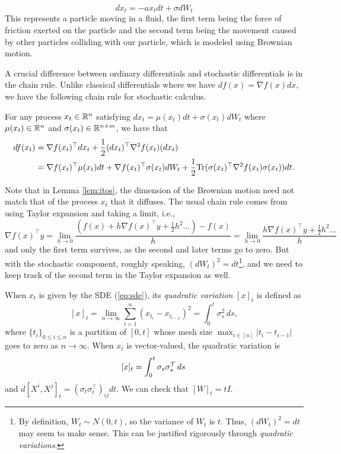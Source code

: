 \[
dx_{t}=-ax_{t}dt+\sigma dW_{t}
\]
This represents a particle moving in a fluid, the first term being
the force of friction exerted on the particle and the second term
being the movement caused by other particles colliding with our particle,
which is modeled using Brownian motion. 

A crucial difference between ordinary differentials and stochastic
differentials is in the chain rule. Unlike classical differentials
where we have $df(x)=\nabla f(x)dx$, we have the following chain
rule for stochastic calculus.
\begin{lem}[It\^{o}'s lemma]
\label{lem:itos}For any process $x_{t}\in\mathbb{R}^{n}$ satisfying $dx_{t}=\mu(x_{t})dt+\sigma(x_{t})dW_{t}$
where $\mu(x_{t})\in\mathbb{R}^{n}$ and $\sigma(x_{t})\in\mathbb{R}^{n\times m}$, we
have that
\begin{align*}
df(x_{t}) & =\nabla f(x_{t})^{\top}dx_{t}+\frac{1}{2}(dx_{t})^{\top}\nabla^{2}f(x_{t})(dx_{t})\\
 & =\nabla f(x_{t})^{\top}\mu(x_{t})dt+\nabla f(x_{t})^{\top}\sigma(x_{t})dW_{t}+\frac{1}{2}\mathrm{Tr}(\sigma(x_{t})^{\top}\nabla^{2}f(x_{t})\sigma(x_{t}))dt.
\end{align*}
\end{lem}

Note that in Lemma \ref{lem:itos}, the dimension of the Brownian
motion need not match that of the process $x_{t}$ that it diffuses.
The usual chain rule comes from using Taylor expansion and taking
a limit, i.e., 
\[
\nabla f(x)^{\top}y=\lim_{h\rightarrow0}\frac{(f(x)+h\nabla f(x)^{\top}y+\frac{1}{2}h^{2}...)-f(x)}{h}=\lim_{h\rightarrow0}\frac{h\nabla f(x)^{\top}y+\frac{1}{2}h^{2}...}{h}
\]
and only the first term survives, as the second and later terms go
to zero. But with the stochastic component, roughly speaking, $(dW_{t})^{2}=dt$\footnote{By definition, $W_{t}\sim N(0,t)$, so the variance of $W_{t}$ is
$t$. Thus, $(dW_{t})^{2}=dt$ may seem to make sense. This can be
justified rigorously through \emph{quadratic variations}.}, and we need to keep track of the second term in the Taylor expansion
as well. 

When $x_{t}$ is given by the SDE (\ref{eq:sde}), its \emph{quadratic
variation} $[x]_{t}$ is defined as
\[
[x]_{t}=\lim_{n\to\infty}\sum^{n}_{i=1}(x_{t_{i}}-x_{t_{i-1}})^{2}=\int^{t}_{0}\sigma^{2}_{s}\,ds,
\]
where $\{t_{i}\}_{0\leq i\leq n}$ is a partition of $[0,t]$ whose
mesh size $\max_{i\in[n]}|t_{i}-t_{i-1}|$ goes to zero as $n\to\infty$.
When $x_{t}$ is vector-valued, the quadratic variation is 
\[
[x]_{t}=\int^{t}_{0}\sigma_{s}\sigma^{\mathcal{\mathcal{T}}}_{s}\,ds\,
\]
and $d[X^{i},X^{j}]_{t}=(\sigma_{t}\sigma^{\top}_{t})_{ij}dt$. We
can check that $[W]_{t}=tI$.

